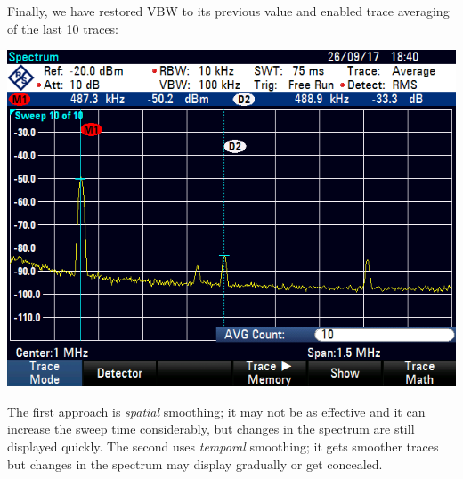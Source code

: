 Finally, we have restored VBW to its previous value and enabled trace
averaging of the last 10 traces:

\includegraphics[width=\textwidth]{assets/1-5-3}

The first approach is \emph{spatial} smoothing; it may not be as effective and
it can increase the sweep time considerably, but changes in the spectrum are
still displayed quickly. The second uses \emph{temporal} smoothing; it gets
smoother traces but changes in the spectrum may display gradually or get
concealed.

\finishpage



